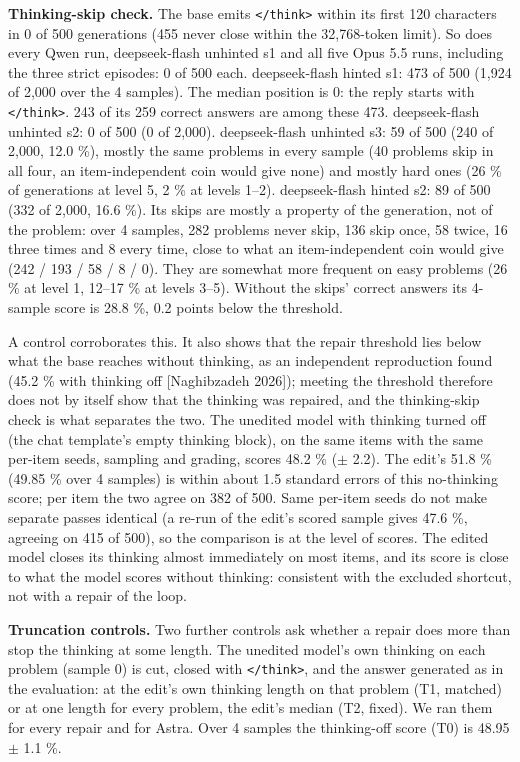 \documentclass[
  10pt,
]{article}
\newcommand{\passthrough}[1]{#1}
\newcounter{none} %
\begin{document}
\textbf{Thinking-skip check.} The base emits
\passthrough{\lstinline!</think>!} within its first 120 characters in 0
of 500 generations (455 never close within the 32,768-token limit). So
does every Qwen run, deepseek-flash unhinted s1 and all five Opus 5.5
runs, including the three strict episodes: 0 of 500 each. deepseek-flash
hinted s1: 473 of 500 (1,924 of 2,000 over the 4 samples). The median
position is 0: the reply starts with \passthrough{\lstinline!</think>!}.
243 of its 259 correct answers are among these 473. deepseek-flash
unhinted s2: 0 of 500 (0 of 2,000). deepseek-flash unhinted s3: 59 of
500 (240 of 2,000, 12.0 \%), mostly the same problems in every sample
(40 problems skip in all four, an item-independent coin would give none)
and mostly hard ones (26 \% of generations at level 5, 2 \% at levels
1--2). deepseek-flash hinted s2: 89 of 500 (332 of 2,000, 16.6 \%). Its
skips are mostly a property of the generation, not of the problem: over
4 samples, 282 problems never skip, 136 skip once, 58 twice, 16 three
times and 8 every time, close to what an item-independent coin would
give (242 / 193 / 58 / 8 / 0). They are somewhat more frequent on easy
problems (26 \% at level 1, 12--17 \% at levels 3--5). Without the
skips' correct answers its 4-sample score is 28.8 \%, 0.2 points below
the threshold.

A control corroborates this. It also shows that the repair threshold
lies below what the base reaches without thinking, as an independent
reproduction found (45.2 \% with thinking off {[}Naghibzadeh 2026{]});
meeting the threshold therefore does not by itself show that the
thinking was repaired, and the thinking-skip check is what separates the
two. The unedited model with thinking turned off (the chat template's
empty thinking block), on the same items with the same per-item seeds,
sampling and grading, scores 48.2 \% (\ensuremath{\pm} 2.2). The edit's 51.8 \% (49.85
\% over 4 samples) is within about 1.5 standard errors of this
no-thinking score; per item the two agree on 382 of 500. Same per-item
seeds do not make separate passes identical (a re-run of the edit's
scored sample gives 47.6 \%, agreeing on 415 of 500), so the comparison
is at the level of scores. The edited model closes its thinking almost
immediately on most items, and its score is close to what the model
scores without thinking: consistent with the excluded shortcut, not with
a repair of the loop.

\textbf{Truncation controls.} Two further controls ask whether a repair
does more than stop the thinking at some length. The unedited model's
own thinking on each problem (sample 0) is cut, closed with
\passthrough{\lstinline!</think>!}, and the answer generated as in the
evaluation: at the edit's own thinking length on that problem (T1,
matched) or at one length for every problem, the edit's median (T2,
fixed). We ran them for every repair and for Astra. Over 4 samples the
thinking-off score (T0) is 48.95 \ensuremath{\pm} 1.1 \%.
\end{document}
